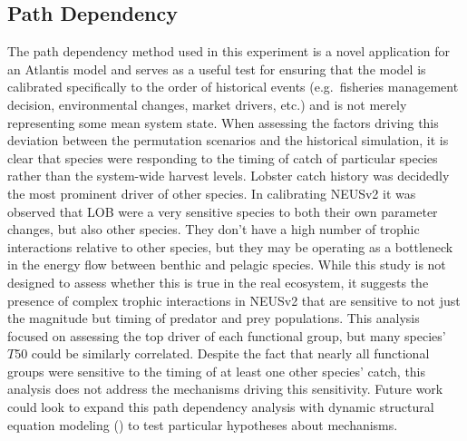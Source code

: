 \documentclass[
]{article}
\begin{document}
\subsection{Path Dependency}\label{path-dependency}

The path dependency method used in this experiment is a novel application for an Atlantis model and serves as a useful test for ensuring that the model is calibrated specifically to the order of historical events (e.g.~fisheries management decision, environmental changes, market drivers, etc.) and is not merely representing some mean system state. When assessing the factors driving this deviation between the permutation scenarios and the historical simulation, it is clear that species were responding to the timing of catch of particular species rather than the system-wide harvest levels. Lobster catch history was decidedly the most prominent driver of other species. In calibrating NEUSv2 it was observed that LOB were a very sensitive species to both their own parameter changes, but also other species. They don't have a high number of trophic interactions relative to other species, but they may be operating as a bottleneck in the energy flow between benthic and pelagic species. While this study is not designed to assess whether this is true in the real ecosystem, it suggests the presence of complex trophic interactions in NEUSv2 that are sensitive to not just the magnitude but timing of predator and prey populations. This analysis focused on assessing the top driver of each functional group, but many species' \(T50\) could be similarly correlated. Despite the fact that nearly all functional groups were sensitive to the timing of at least one other species' catch, this analysis does not address the mechanisms driving this sensitivity. Future work could look to expand this path dependency analysis with dynamic structural equation modeling () to test particular hypotheses about mechanisms.
\end{document}

